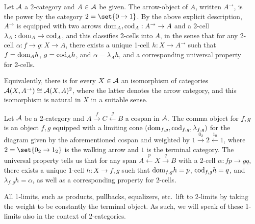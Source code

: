 \documentclass[../thesis.tex]{subfiles}
\begin{document}
\begin{example}
  Let ${\mathcal{A}}$ a 2-category and $A \in {\mathcal{A}}$ be given. The arrow-object of $A$, written $A^\to$, is the power by the category
  $2 = \set{0 \to 1}$. By the above explicit description, $A^\to$ is equipped with two arrows ${\mathrm{dom}}_A,{\mathrm{cod}}_A : A^\to \to A$ and
  a 2-cell $\lambda_A : {\mathrm{dom}}_A \to {\mathrm{cod}}_A$, and this classifies 2-cells into $A$, in the sense that for any 2-cell $\alpha
  : f \to g : X \to A$, there exists a unique 1-cell $h : X \to A^\to$ such that $f = {\mathrm{dom}}_A h$, $g = {\mathrm{cod}}_A h$, and
  $\alpha = \lambda_A h$, and a corresponding universal property for 2-cells.

  Equivalently, there is for every $X \in {\mathcal{A}}$ an isomorphism of categories ${\mathcal{A}}(X,A^\to) \cong {\mathcal{A}}(X,A)^2$,
  where the latter denotes the arrow category, and this isomorphism is natural in $X$ in a suitable sense.
\end{example}

\begin{example}
  Let ${\mathcal{A}}$ be a 2-category and $A \xrightarrow{f} C \xleftarrow{g} B$ a cospan in ${\mathcal{A}}$. The comma object for $f,g$ is an
  object $f \comma g$ equipped with a limiting cone $({\mathrm{dom}}_{f,g}, {\mathrm{cod}}_{f,g}, \lambda_{f,g})$ for the diagram given by the
  aforementioned cospan and weighted by $1 \xrightarrow{0_2} 2 \xleftarrow{1_0} 1$, where $2 = \set{0_2 \to 1_2}$ is the
  walking arrow and $1$ is the terminal category. The universal property tells us that for any span $A \xleftarrow{p} X
  \xrightarrow{q} B$ with a 2-cell $\alpha : fp \to gq$, there exists a unique 1-cell $h : X \to f \comma g$ such that
  ${\mathrm{dom}}_{f,g} h = p$, ${\mathrm{cod}}_{f,g} h = q$, and $\lambda_{f,g} h = \alpha$, as well as a corresponding property for 2-cells.
\end{example}

\begin{example}[1-limits]
  All 1-limits, such as products, pullbacks, equalizers, etc.\ lift to 2-limits by taking the weight to be constantly the
  terminal object. As such, we will speak of these 1-limits also in the context of 2-categories. 
\end{example}
\end{document}
